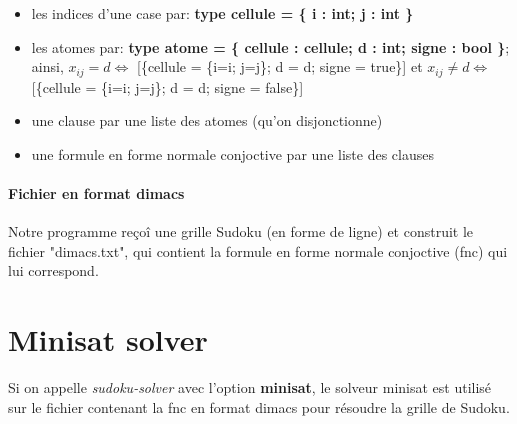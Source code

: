 \documentclass[10pt,a4paper]{article}
\begin{document}
\begin{itemize}
\item les indices d'une case par: \textbf{type cellule = \{ i : int; j : int \}}
\item les atomes par: \textbf{type atome = \{ cellule : cellule; d : int; signe : bool \}}; ainsi, $x_{ij}=d \Leftrightarrow$ {[\{cellule = \{i=i; j=j\}; d = d; signe = true\}]} et $x_{ij}\neq d \Leftrightarrow$ {[\{cellule = \{i=i; j=j\}; d = d; signe = false\}]}
\item une clause par une liste des atomes (qu'on disjonctionne)
\item une formule en forme normale conjoctive par une liste des clauses
\end{itemize}

\paragraph{Fichier en format dimacs}

Notre programme re\c{c}o\^{i} une grille Sudoku (en forme de ligne) et construit le fichier "dimacs.txt", qui contient la formule en forme normale conjoctive (fnc) qui lui correspond.

\begin{center}

\end{center}
\section{Minisat solver}
Si on appelle \textit{sudoku-solver} avec l'option \textbf{minisat}, le solveur minisat est utilis\'{e} sur le fichier contenant la fnc en format dimacs pour r\'{e}soudre la grille de Sudoku. 
\end{document}
